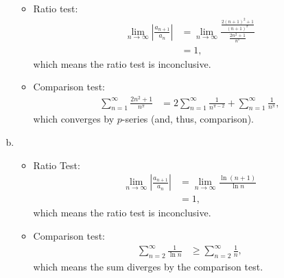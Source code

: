 \documentclass[10pt]{mypackage}
\begin{document}
\begin{enumerate}[(a)]
    \begin{itemize}
      \item Ratio test:
        \begin{align*}
          \lim_{n\rightarrow\infty}\left\vert \frac{a_{n+1}}{a_n} \right\vert &= \lim_{n\rightarrow\infty}\frac{\frac{2\left(n+1\right)^2 + 1}{\left(n+1\right)^\pi}}{\frac{2n^2 + 1}{n^{\pi}}}\\
                                                                              &= 1,
        \end{align*}
        which means the ratio test is inconclusive.
      \item Comparison test:
        \begin{align*}
          \sum_{n=1}^{\infty}\frac{2n^2 + 1}{n^{\pi}} &= 2\sum_{n=1}^{\infty}\frac{1}{n^{\pi-2}} + \sum_{n=1}^{\infty}\frac{1}{n^{\pi}},
        \end{align*}
        which converges by $p$-series (and, thus, comparison).
    \end{itemize}
  \item
    \begin{itemize}
      \item Ratio Test:
        \begin{align*}
          \lim_{n\rightarrow\infty}\left\vert \frac{a_{n+1}}{a_n} \right\vert &= \lim_{n\rightarrow\infty}\frac{\ln\left(n+1\right)}{\ln n}\\
                                                                              &= 1,
        \end{align*}
        which means the ratio test is inconclusive.
      \item Comparison test:
        \begin{align*}
          \sum_{n=2}^{\infty}\frac{1}{\ln n} &\geq \sum_{n=2}^{\infty}\frac{1}{n},
        \end{align*}
        which means the sum diverges by the comparison test.
    \end{itemize}
\end{enumerate}
\end{document}
